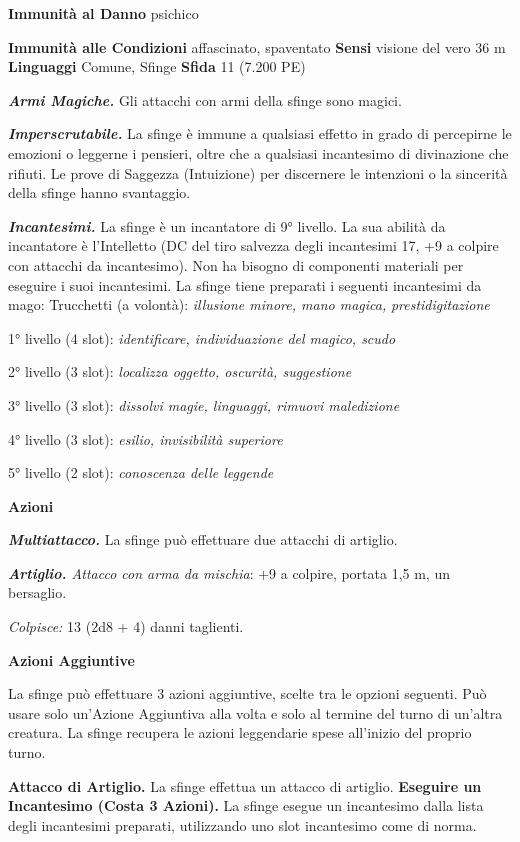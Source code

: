 \begin{multicols}{2}
\textbf{Immunità al Danno} psichico

\textbf{Immunità alle Condizioni} affascinato, spaventato \textbf{Sensi}
visione del vero 36 m \textbf{Linguaggi} Comune,
Sfinge \textbf{Sfida} 11 (7.200 PE)

\emph{\textbf{Armi Magiche.}} Gli attacchi con armi della sfinge sono
magici.

\emph{\textbf{Imperscrutabile.}} La sfinge è immune a qualsiasi effetto
in grado di percepirne le emozioni o leggerne i pensieri, oltre che a
qualsiasi incantesimo di divinazione che rifiuti. Le prove di Saggezza
(Intuizione) per discernere le intenzioni o la sincerità della sfinge
hanno svantaggio.

\emph{\textbf{Incantesimi.}} La sfinge è un incantatore di 9° livello.
La sua abilità da incantatore è l'Intelletto (DC del tiro salvezza
degli incantesimi 17, +9 a colpire con attacchi da incantesimo). Non ha
bisogno di componenti materiali per eseguire i suoi incantesimi. La
sfinge tiene preparati i seguenti incantesimi da mago: Trucchetti (a
volontà): \emph{illusione minore, mano magica,} \emph{prestidigitazione}

1° livello (4 slot): \emph{identificare, individuazione del magico,
scudo}

2° livello (3 slot): \emph{localizza oggetto, oscurità, suggestione}

3° livello (3 slot): \emph{dissolvi magie, linguaggi, rimuovi
maledizione}

4° livello (3 slot): \emph{esilio, invisibilità superiore}

5° livello (2 slot): \emph{conoscenza delle leggende}

\textbf{Azioni}

\emph{\textbf{Multiattacco.}} La sfinge può effettuare due attacchi di
artiglio.

\emph{\textbf{Artiglio.} Attacco con arma da mischia}: +9 a colpire,
portata 1,5 m, un bersaglio.

\emph{Colpisce:} 13 (2d8 + 4) danni taglienti.

\textbf{Azioni Aggiuntive}

La sfinge può effettuare 3 azioni aggiuntive, scelte tra le opzioni
seguenti. Può usare solo un'Azione Aggiuntiva alla volta e solo al
termine del turno di un'altra creatura. La sfinge recupera le azioni
leggendarie spese all'inizio del proprio turno.

\textbf{Attacco di Artiglio.} La sfinge effettua un attacco di artiglio.
\textbf{Eseguire un Incantesimo (Costa 3 Azioni).} La sfinge esegue un
incantesimo dalla lista degli incantesimi preparati, utilizzando uno
slot incantesimo come di norma.


\end{multicols}
